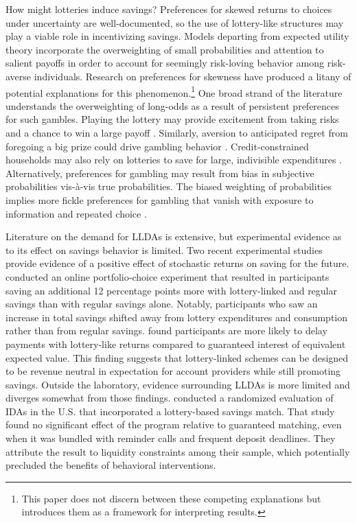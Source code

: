 \documentclass[12pt]{article}
\begin{document}
	How might lotteries induce savings? Preferences for skewed returns to choices under uncertainty are well-documented, so the use of lottery-like structures may play a viable role in incentivizing savings. Models departing from expected utility theory incorporate the overweighting of small probabilities  and attention to salient payoffs  in order to account for seemingly risk-loving behavior among risk-averse individuals. Research on preferences for skewness have produced a litany of potential explanations for this phenomenon.\footnote{This paper does not discern between these competing explanations but introduces them as a framework for interpreting results.} One broad strand of the literature understands the overweighting of long-odds as a result of persistent preferences for such gambles. Playing the lottery may provide excitement from taking risks and a chance to win a large payoff . Similarly, aversion to anticipated regret from foregoing a big prize could drive gambling behavior . Credit-constrained households may also rely on lotteries to save for large, indivisible expenditures . Alternatively, preferences for gambling may result from bias in subjective probabilities vis-\`{a}-vis true probabilities. The biased weighting of probabilities implies more fickle preferences for gambling that vanish with exposure to information and repeated choice .


	Literature on the demand for LLDAs is extensive, but experimental evidence as to its effect on savings behavior is limited. Two recent experimental studies provide evidence of a positive effect of stochastic returns on saving for the future.  conducted an online portfolio-choice experiment that resulted in participants saving an additional 12 percentage points more with lottery-linked and regular savings than with regular savings alone. Notably, participants who saw an increase in total savings shifted away from lottery expenditures and consumption rather than from regular savings.  found participants are more likely to delay payments with lottery-like returns compared to guaranteed interest of equivalent expected value. This finding suggests that lottery-linked schemes can be designed to be revenue neutral in expectation for account providers while still promoting savings. Outside the laboratory, evidence surrounding LLDAs is more limited and diverges somewhat from those findings.  conducted a randomized evaluation of IDAs in the U.S. that incorporated a lottery-based savings match. That study found no significant effect of the program relative to guaranteed matching, even when it was bundled with reminder calls and frequent deposit deadlines. They attribute the result to liquidity constraints among their sample, which potentially precluded the benefits of behavioral interventions.
\end{document}
